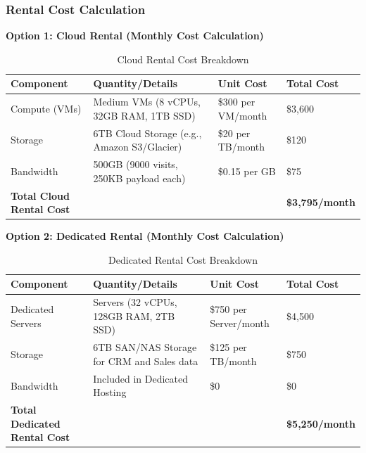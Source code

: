 \documentclass{llncs}
\begin{document}
\subsubsection{Rental Cost Calculation}
\textbf{Option 1: Cloud Rental (Monthly Cost Calculation)}
\vspace{3pt}
\begin{table}[H]
\centering
\begin{tabular}{|>{\raggedright\arraybackslash}p{3cm}|>{\raggedright\arraybackslash}p{6cm}|>{\raggedleft\arraybackslash}p{3cm}|>{\raggedleft\arraybackslash}p{3cm}|}
\hline
\textbf{Component}      & \textbf{Quantity/Details}                          & \textbf{Unit Cost} & \textbf{Total Cost} \\ \hline
Compute (VMs)           & 12 Medium VMs (8 vCPUs, 32GB RAM, 1TB SSD)         & \$300 per VM/month & \$3,600             \\ \hline
Storage                 & 6TB Cloud Storage (e.g., Amazon S3/Glacier)        & \$20 per TB/month  & \$120               \\ \hline
Bandwidth               & 500GB (9000 visits, 250KB payload each)            & \$0.15 per GB      & \$75                \\ \hline
\textbf{Total Cloud Rental Cost} &                                          &                    & \textbf{\$3,795/month} \\ \hline
\end{tabular}
\caption{Cloud Rental Cost Breakdown}
\end{table}

\textbf{Option 2: Dedicated Rental (Monthly Cost Calculation)}
\vspace{3pt}
\begin{table}[h!]
\centering
\begin{tabular}{|>{\raggedright\arraybackslash}p{3cm}|>{\raggedright\arraybackslash}p{6cm}|>{\raggedleft\arraybackslash}p{3cm}|>{\raggedleft\arraybackslash}p{3cm}|}
\hline
\textbf{Component}      & \textbf{Quantity/Details}                          & \textbf{Unit Cost} & \textbf{Total Cost} \\ \hline
Dedicated Servers       & 6 Servers (32 vCPUs, 128GB RAM, 2TB SSD)           & \$750 per Server/month & \$4,500         \\ \hline
Storage                 & 6TB SAN/NAS Storage for CRM and Sales data         & \$125 per TB/month & \$750               \\ \hline
Bandwidth               & Included in Dedicated Hosting                      & \$0                & \$0                 \\ \hline
\textbf{Total Dedicated Rental Cost} &                                       &                    & \textbf{\$5,250/month} \\ \hline
\end{tabular}
\caption{Dedicated Rental Cost Breakdown}
\end{table}
\end{document}
